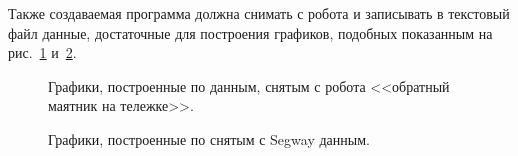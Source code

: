 \documentclass[12pt,a4paper,openany]{extarticle}
\begin{document}
\begin{enumerate}
	Также создаваемая программа должна снимать с робота и записывать в текстовый файл данные, достаточные для построения графиков, подобных показанным на рис.~\ref{fig:graphics_from_inv_pend} и~\ref{fig:graphics_from_segway}.
	
\begin{figure}[h]
	\noindent{}
	\caption{Графики, построенные по данным, снятым с робота <<обратный маятник на тележке>>.}
	\label{fig:graphics_from_inv_pend}
\end{figure}

\begin{figure}[p]
	\noindent{}
	\caption{Графики, построенные по снятым с Segway данным.}
	\label{fig:graphics_from_segway}
\end{figure}


\end{enumerate}
\end{document}
